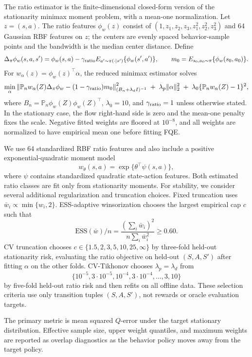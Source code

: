 \documentclass{article}
\theoremstyle{plain}
\theoremstyle{definition}
\theoremstyle{remark}
\begin{document}
The ratio estimator is the finite-dimensional closed-form version of the
stationarity minimax moment problem, with a mean-one normalization. Let
\(z=(s,a)\). The ratio features \(\phi_w(z)\) consist of
\((1,z_1,z_2,z_3,z_1^2,z_2^2,z_3^2)\) and 64 Gaussian RBF features on \(z\);
the centers are evenly spaced behavior-sample points and the bandwidth is the
median center distance. Define
\[
\Delta_\pi\phi_w(s,a,s')
  =
  \phi_w(s,a)-\gamma_{\rm ratio}
    E_{a'\sim\pi(\cdot\mid s')}\{\phi_w(s',a')\},
\qquad
m_0=E_{s_0,a_0\sim\pi}\{\phi_w(s_0,a_0)\}.
\]
For \(w_\alpha(z)=\phi_w(z)^\top\alpha\), the reduced minimax estimator solves
\[
\min_\alpha
\left\|
\mathbb P_n w_\alpha(Z)\Delta_\pi\phi_w
-(1-\gamma_{\rm ratio})m_0
\right\|^2_{(B_n+\lambda_d I)^{-1}}
\;+\;\lambda_p\|\alpha\|_2^2
\;+\;\lambda_0\{\mathbb P_n w_\alpha(Z)-1\}^2,
\]
where \(B_n=\mathbb P_n\phi_w(Z)\phi_w(Z)^\top\), \(\lambda_0=10\), and
\(\gamma_{\rm ratio}=1\) unless otherwise stated. In the stationary case, the
flow right-hand side is zero and the mean-one penalty fixes the scale. Negative
fitted weights are floored at \(10^{-8}\), and all weights are normalized to
have empirical mean one before fitting FQE.

We use 64 standardized RBF ratio features and also include a positive
exponential-quadratic moment model
\[
w_\theta(s,a)=\exp\{\theta^\top\psi(s,a)\},
\]
where \(\psi\) contains standardized quadratic state-action features. Both
estimated ratio classes are fit only from stationarity moments. For stability,
we consider several additional regularization and truncation choices. Fixed
truncation uses \(\bar w_i\propto\min\{w_i,2\}\). ESS-adaptive winsorization
chooses the largest empirical cap \(c\) such that
\[
  \mathrm{ESS}(\bar w)/n
  =
  \frac{(\sum_i\bar w_i)^2}{n\sum_i\bar w_i^2}
  \ge0.60 .
\]
CV truncation chooses \(c\in\{1.5,2,3,5,10,25,\infty\}\) by three-fold
held-out stationarity risk, evaluating the ratio objective on held-out
\((S,A,S')\) after fitting \(\alpha\) on the other folds. CV-Tikhonov chooses
\(\lambda_p=\lambda_d\) from
\[
\{10^{-5},3{\cdot}10^{-5},10^{-4},3{\cdot}10^{-4},\ldots,3,10\}
\]
by five-fold held-out ratio risk and then refits on all offline data. These
selection criteria use only transition tuples \((S,A,S')\), not rewards or
oracle evaluation targets.

The primary metric is mean squared \(Q\)-error under the target stationary
distribution. Effective sample size, upper weight quantiles, and maximum
weights are reported as overlap diagnostics as the behavior policy moves away
from the target policy.
\end{document}

